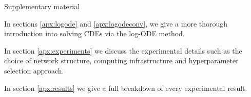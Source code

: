 \appendix
\begin{center}
	\huge Supplementary material
\end{center}
	
In sections \ref{apx:logode} and \ref{apx:logodeconv}, we give a more thorough introduction into solving CDEs via the log-ODE method.

In section \ref{apx:experiments} we discuss the experimental details such as the choice of network structure, computing infrastructure and hyperparameter selection approach.

In section \ref{apx:results} we give a full breakdown of every experimental result.








